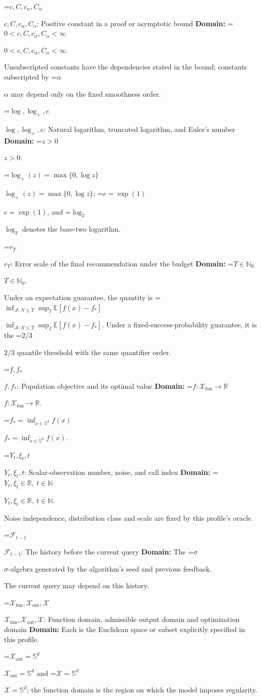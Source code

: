 \documentclass[10pt,a4paper]{article}
\newcommand{\AtlasMath}[1]{\par\begingroup\centering\setbox0=\hbox{$\displaystyle #1$}\ifdim\wd0>1.4\linewidth\typeout{ATLAS WIDE FORMULA: \the\wd0}\fi\ifdim\wd0>\linewidth\resizebox{\linewidth}{!}{\box0}\else\box0\fi\par\endgroup}
\newcommand{\AtlasInlineMath}[1]{\begingroup\setbox0=\hbox{$#1$}\ifdim\wd0>.4\linewidth\endgroup\AtlasMath{#1}\else\endgroup$#1$\fi}
\begin{document}
\AtlasInlineMath{c,C,c_\alpha,C_\alpha}: Positive constant in a proof or asymptotic bound \textbf{Domain:} \AtlasInlineMath{0<c,C,c_\alpha,C_\alpha<\infty}.

Unsubscripted constants have the dependencies stated in the bound; constants subscripted by \AtlasInlineMath{\alpha} may depend only on the fixed smoothness order.

\AtlasInlineMath{\log,\log_+,e}: Natural logarithm, truncated logarithm, and Euler's number \textbf{Domain:} \AtlasInlineMath{z>0}.

\AtlasInlineMath{\log_+(z)=\max\{0,\log z\}}; \AtlasInlineMath{e=\exp(1)}, and \AtlasInlineMath{\log_2} denotes the base-two logarithm.

\AtlasInlineMath{r_T}: Error scale of the final recommendation under the budget \textbf{Domain:} \AtlasInlineMath{T\in\mathbb{N}_0}.

Under an expectation guarantee, the quantity is \AtlasInlineMath{\inf_{\mathcal{A}:N\le T}\sup_I\mathbb{E}[f(\widehat{x})-f_*]}. Under a fixed-success-probability guarantee, it is the \AtlasInlineMath{2/3} quantile threshold with the same quantifier order.

\AtlasInlineMath{f,f_*}: Population objective and its optimal value \textbf{Domain:} \AtlasInlineMath{f:\mathcal{X}_{\mathrm{fun}}\to\mathbb{R}}.

\AtlasInlineMath{f_*=\inf_{x\in \mathbb{S}^d}f(x)}.

\AtlasInlineMath{Y_t,\xi_t,t}: Scalar-observation number, noise, and call index \textbf{Domain:} \AtlasInlineMath{Y_t,\xi_t\in\mathbb{R},\ t\in\mathbb{N}}.

Noise independence, distribution class and scale are fixed by this profile's oracle.

\AtlasInlineMath{\mathcal{F}_{t-1}}: The history before the current query \textbf{Domain:} The \AtlasInlineMath{\sigma}-algebra generated by the algorithm's seed and previous feedback.

The current query may depend on this history.

\AtlasInlineMath{\mathcal{X}_{\mathrm{fun}},\mathcal{X}_{\mathrm{out}},\mathcal{X}}: Function domain, admissible output domain and optimization domain \textbf{Domain:} Each is the Euclidean space or subset explicitly specified in this profile.

\AtlasInlineMath{\mathcal{X}_{\mathrm{out}}=\mathbb{S}^d} and \AtlasInlineMath{\mathcal{X}=\mathbb{S}^d}; the function domain is the region on which the model imposes regularity.
\end{document}
